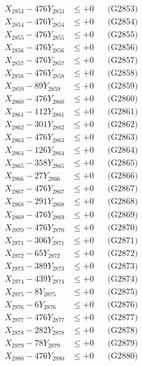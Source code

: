 \documentclass[a4paper,10pt]{article}
\begin{document}
{\begin{align}
X_{2853} - 476Y_{2853} &\leq +0 && \text{(G2853)} \\
X_{2854} - 476Y_{2854} &\leq +0 && \text{(G2854)} \\
X_{2855} - 476Y_{2855} &\leq +0 && \text{(G2855)} \\
X_{2856} - 476Y_{2856} &\leq +0 && \text{(G2856)} \\
X_{2857} - 476Y_{2857} &\leq +0 && \text{(G2857)} \\
X_{2858} - 476Y_{2858} &\leq +0 && \text{(G2858)} \\
X_{2859} - 89Y_{2859} &\leq +0 && \text{(G2859)} \\
X_{2860} - 476Y_{2860} &\leq +0 && \text{(G2860)} \\
\allowbreak
X_{2861} - 112Y_{2861} &\leq +0 && \text{(G2861)} \\
X_{2862} - 301Y_{2862} &\leq +0 && \text{(G2862)} \\
X_{2863} - 476Y_{2863} &\leq +0 && \text{(G2863)} \\
X_{2864} - 126Y_{2864} &\leq +0 && \text{(G2864)} \\
X_{2865} - 358Y_{2865} &\leq +0 && \text{(G2865)} \\
X_{2866} - 27Y_{2866} &\leq +0 && \text{(G2866)} \\
X_{2867} - 476Y_{2867} &\leq +0 && \text{(G2867)} \\
X_{2868} - 291Y_{2868} &\leq +0 && \text{(G2868)} \\
X_{2869} - 476Y_{2869} &\leq +0 && \text{(G2869)} \\
X_{2870} - 476Y_{2870} &\leq +0 && \text{(G2870)} \\
\allowbreak
X_{2871} - 306Y_{2871} &\leq +0 && \text{(G2871)} \\
X_{2872} - 65Y_{2872} &\leq +0 && \text{(G2872)} \\
X_{2873} - 389Y_{2873} &\leq +0 && \text{(G2873)} \\
X_{2874} - 439Y_{2874} &\leq +0 && \text{(G2874)} \\
X_{2875} - 8Y_{2875} &\leq +0 && \text{(G2875)} \\
X_{2876} - 6Y_{2876} &\leq +0 && \text{(G2876)} \\
X_{2877} - 476Y_{2877} &\leq +0 && \text{(G2877)} \\
X_{2878} - 282Y_{2878} &\leq +0 && \text{(G2878)} \\
X_{2879} - 78Y_{2879} &\leq +0 && \text{(G2879)} \\
X_{2880} - 476Y_{2880} &\leq +0 && \text{(G2880)} \\

\end{align}}
\end{document}
